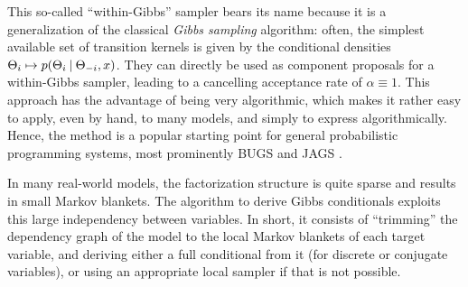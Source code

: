 This so-called \enquote{within-Gibbs} sampler bears its name because it is a generalization of the
classical \emph{Gibbs sampling} algorithm: often, the simplest available set of transition kernels
is given by the conditional densities \(\Theta_{i} \mapsto p(\Theta_{i} \:\vert\: \Theta_{-i},
x)\). They can directly be used as component proposals for a within-Gibbs sampler, leading to a
cancelling acceptance rate of \(\alpha \equiv 1\).  This approach has the advantage of being very
algorithmic, which makes it rather easy to apply, even by hand, to many models, and simply to
express algorithmically.  Hence, the method is a popular starting point for general probabilistic
programming systems, most prominently BUGS \parencite{lunn2000winbugs} and JAGS
\parencite{plummer2003jags}.

In many real-world models, the factorization structure is quite sparse and results in small Markov
blankets.  The algorithm to derive Gibbs conditionals exploits this large independency between
variables.  In short, it consists of \enquote{trimming} the dependency graph of the model to the
local Markov blankets of each target variable, and deriving either a full conditional from it (for
discrete or conjugate variables), or using an appropriate local sampler if that is not possible.


